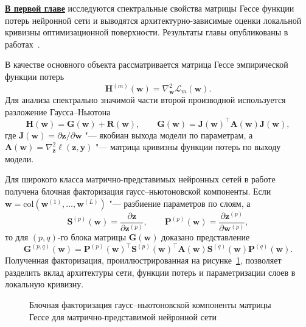 \underline{\textbf{В первой главе}} исследуются спектральные свойства матрицы Гессе функции потерь нейронной сети и выводятся архитектурно-зависимые оценки локальной кривизны оптимизационной поверхности. Результаты главы опубликованы в работах~\cite{kiselev2024unraveling,meshkov2024convnets}.

В качестве основного объекта рассматривается матрица Гессе эмпирической функции потерь
\begin{equation}
\mathbf{H}^{(m)}(\mathbf{w})=\nabla_{\mathbf w}^2 \mathcal L_m(\mathbf w).
\end{equation}
Для анализа спектрально значимой части второй производной используется разложение Гаусса--Ньютона
\begin{equation}
\mathbf H(\mathbf w)=\mathbf G(\mathbf w)+\mathbf R(\mathbf w), \qquad
\mathbf G(\mathbf w)=\mathbf J(\mathbf w)^\top \mathbf A(\mathbf w)\mathbf J(\mathbf w),
\end{equation}
где $\mathbf J(\mathbf w)=\partial \mathbf z/\partial \mathbf w$ "--- якобиан выхода модели по параметрам, а $\mathbf A(\mathbf w)=\nabla_{\mathbf z}^2\ell(\mathbf z, \mathbf y)$ "--- матрица кривизны функции потерь по выходу модели.

Для широкого класса матрично-представимых нейронных сетей в работе получена блочная факторизация гаусс--ньютоновской компоненты. Если $\mathbf w=\mathrm{col}(\mathbf w^{(1)}, \dots, \mathbf w^{(L)})$ "--- разбиение параметров по слоям, а
\[
\mathbf S^{(p)}(\mathbf w)=\frac{\partial \mathbf z}{\partial \mathbf z^{(p)}}, \qquad
\mathbf P^{(p)}(\mathbf w)=\frac{\partial \mathbf z^{(p)}}{\partial \mathbf w^{(p)}},
\]
то для $(p, q)$-го блока матрицы $\mathbf G(\mathbf w)$ доказано представление
\begin{equation}
\mathbf G^{(p, q)}(\mathbf w)=
\mathbf P^{(p)}(\mathbf w)^\top
\mathbf S^{(p)}(\mathbf w)^\top
\mathbf A(\mathbf w)
\mathbf S^{(q)}(\mathbf w)
\mathbf P^{(q)}(\mathbf w).
\end{equation}
Полученная факторизация, проиллюстрированная на рисунке~\ref{fig:synopsis-gn-factorization}, позволяет разделить вклад архитектуры сети, функции потерь и параметризации слоев в локальную кривизну.

\begin{figure}[ht]
    \centering
    \resizebox{\linewidth}{!}{}
    \caption{Блочная факторизация гаусс--ньютоновской компоненты матрицы Гессе для матрично-представимой нейронной сети}
    \label{fig:synopsis-gn-factorization}
\end{figure}

